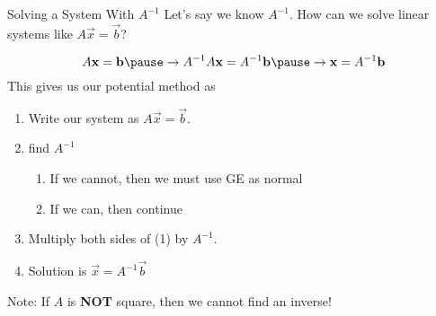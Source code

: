 \documentclass[xcoler=dvipsnames, aspectratio=169]{beamer}
\begin{document}
    \begin{frame}{Solving a System With $A^{-1}$}
        \small
        Let's say we know $A^{-1}$. How can we solve linear systems like $A\vec{x} = \vec{b}$?\pause

        \[
            A\vec{x} = \vec{b} \pause\rightarrow A^{-1}A\vec{x} = A^{-1}\vec{b} \pause\rightarrow \vec{x} = A^{-1}\vec{b}
        \]
        \pause
        This gives us our potential method as\pause
        \begin{tcolorbox}
        \begin{enumerate}
            \item Write our system as $A\vec{x} = \vec{b}$.\pause
            \item find $A^{-1}$\pause
                \begin{enumerate}
                    \item If we cannot, then we must use GE as normal\pause
                    \item If we can, then continue\pause
                \end{enumerate}
            \item Multiply both sides of (1) by $A^{-1}$.\pause
            \item Solution is $\vec{x} = A^{-1}\vec{b}$
        \end{enumerate}
        \end{tcolorbox}
        \begin{tcolorbox}
            Note: If $A$ is \textbf{NOT} square, then we cannot find an inverse!
        \end{tcolorbox}
    \end{frame}
\end{document}

